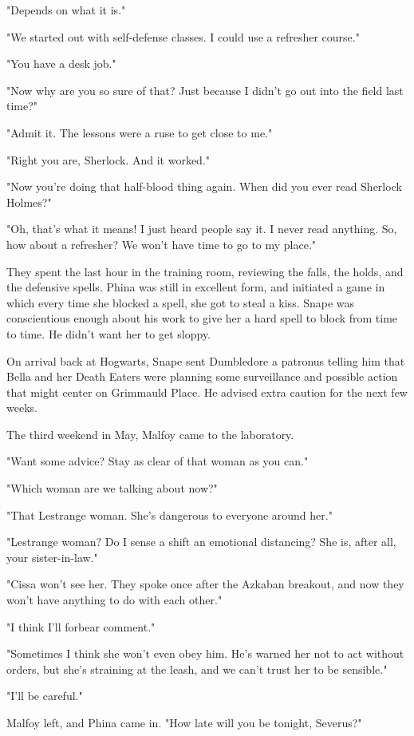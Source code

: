 "Depends on what it is."

"We started out with self-defense classes. I could use a refresher course."

"You have a desk job."

"Now why are you so sure of that? Just because I didn't go out into the field last time?"

"Admit it. The lessons were a ruse to get close to me."

"Right you are, Sherlock. And it worked."

"Now you're doing that half-blood thing again. When did you ever read Sherlock Holmes?"

"Oh, that's what it means! I just heard people say it. I never read anything. So, how about a refresher? We won't have time to go to my place."

They spent the last hour in the training room, reviewing the falls, the holds, and the defensive spells. Phina was still in excellent form, and initiated a game in which every time she blocked a spell, she got to steal a kiss. Snape was conscientious enough about his work to give her a hard spell to block from time to time. He didn't want her to get sloppy.

On arrival back at Hogwarts, Snape sent Dumbledore a patronus telling him that Bella and her Death Eaters were planning some surveillance and possible action that might center on Grimmauld Place. He advised extra caution for the next few weeks.

The third weekend in May, Malfoy came to the laboratory.

"Want some advice? Stay as clear of that woman as you can."

"Which woman are we talking about now?"

"That Lestrange woman. She's dangerous to everyone around her."

"Lestrange woman? Do I sense a shift{\el} an emotional distancing? She is, after all, your sister-in-law."

"Cissa won't see her. They spoke once after the Azkaban breakout, and now they won't have anything to do with each other."

"I think I'll forbear comment."

"Sometimes I think she won't even obey{\el} him. He's warned her not to act without orders, but she's straining at the leash, and we can't trust her to be sensible."

"I'll be careful."

Malfoy left, and Phina came in. "How late will you be tonight, Severus?"

